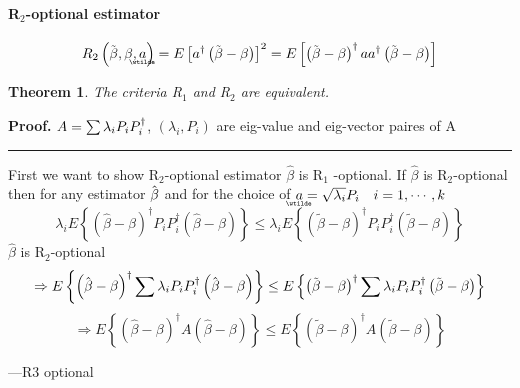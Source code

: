 \documentclass{article}
\newtheorem{theorem}{Theorem}
\newenvironment{proof}[1][Proof]{\noindent\textbf{#1.} }{\ \rule{0.5em}{0.5em}}
\begin{document}
\paragraph{R$_{2}$-optional estimator}

\begin{equation*}
R_{2}\left( \tilde{\beta},\beta ,%
\underaccent{\wtilde}{a}%
\right) =E\left[ a^{\dagger }\left( \tilde{\beta}-\beta \right) \right]
^{2}=E\left[ \left( \tilde{\beta}-\beta \right) ^{\dagger }aa^{\dagger
}\left( \tilde{\beta}-\beta \right) \right]
\end{equation*}

\begin{theorem}
The criteria R$_{1}$ and R$_{2}$ are equivalent.
\end{theorem}

\begin{proof}
$A=\tsum \lambda _{i}P_{i}P_{i}^{\dagger }$, $\left( \lambda
_{i},P_{i}\right) $ are eig-value and eig-vector paires of A
\end{proof}

First we want to show R$_{2}$-optional estimator $\hat{\beta}$ is R$_{1}$%
-optional. If $\hat{\beta}$ is R$_{2}$-optional then for any estimator $\hat{%
\beta}$ and for the choice of $%
\underaccent{\wtilde}{a}%
=\sqrt{\lambda _{i}}P_{i}\quad i=1,\cdots ,k$%
\begin{equation*}
\lambda _{i}E\left\{ \left( \hat{\beta}-\beta \right) ^{\dagger
}P_{i}P_{i}^{\dagger }\left( \hat{\beta}-\beta \right) \right\} \leq \lambda
_{i}E\left\{ \left( \tilde{\beta}-\beta \right) ^{\dagger
}P_{i}P_{i}^{\dagger }\left( \tilde{\beta}-\beta \right) \right\}
\end{equation*}%
$\hat{\beta}$ is R$_{2}$-optional%
\begin{equation*}
\Rightarrow E\left\{ \left( \hat{\beta}-\beta \right) ^{\dagger }\dsum
\lambda _{i}P_{i}P_{i}^{\dagger }\left( \hat{\beta}-\beta \right) \right\}
\leq E\left\{ \left( \tilde{\beta}-\beta \right) ^{\dagger }\dsum \lambda
_{i}P_{i}P_{i}^{\dagger }\left( \tilde{\beta}-\beta \right) \right\}
\end{equation*}%
\begin{equation*}
\Rightarrow E\left\{ \left( \hat{\beta}-\beta \right) ^{\dagger }A\left( 
\hat{\beta}-\beta \right) \right\} \leq E\left\{ \left( \tilde{\beta}-\beta
\right) ^{\dagger }A\left( \tilde{\beta}-\beta \right) \right\}
\end{equation*}

---R3 optional\bigskip 

\bigskip 
\end{document}
